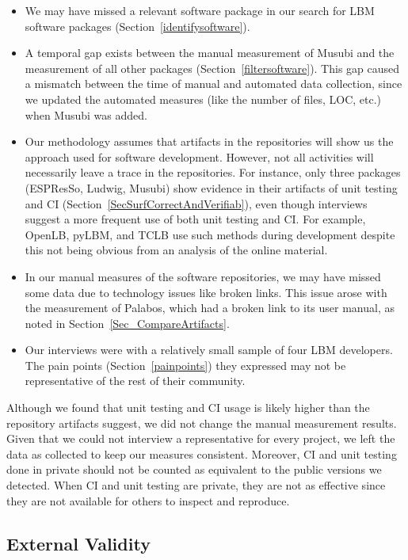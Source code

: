 \documentclass[final, 3p, times, authoryear]{elsarticle}
\begin{document}
\begin{itemize}
\item We may have missed a relevant software package in our search for LBM
software packages (Section~\ref{identifysoftware}).
\item A temporal gap exists between the manual measurement of Musubi and the
measurement of all other packages (Section~\ref{filtersoftware}). This gap
caused a mismatch between the time of manual and automated data collection,
since we updated the automated measures (like the number of files, LOC, etc.)
when Musubi was added.
\item Our methodology assumes that artifacts in the repositories will show us
the approach used for software development.  However, not all activities will
necessarily leave a trace in the repositories. For instance, only three packages
(ESPResSo, Ludwig, Musubi) show evidence in their artifacts of unit testing and
CI (Section~\ref{SecSurfCorrectAndVerifiab}), even though interviews suggest a
more frequent use of both unit testing and CI. For example, OpenLB, pyLBM, and
TCLB use such methods during development despite this not being obvious from an
analysis of the online material.
\item In our manual measures of the software repositories, we may have missed
some data due to technology issues like broken links. This issue arose with the
measurement of Palabos, which had a broken link to its user manual, as noted in
Section~\ref{Sec_CompareArtifacts}. 
\item Our interviews were with a relatively small sample of four LBM developers.
The pain points (Section~\ref{painpoints}) they expressed may not be
representative of the rest of their community.
\end{itemize}

Although we found that unit testing and CI usage is likely higher than the
repository artifacts suggest, we did not change the manual measurement results.
Given that we could not interview a representative for every project, we left
the data as collected to keep our measures consistent.  Moreover, CI and unit
testing done in private should not be counted as equivalent to the public
versions we detected.  When CI and unit testing are private, they are not as
effective since they are not available for others to inspect and reproduce.

\subsection{External Validity}
\end{document}

